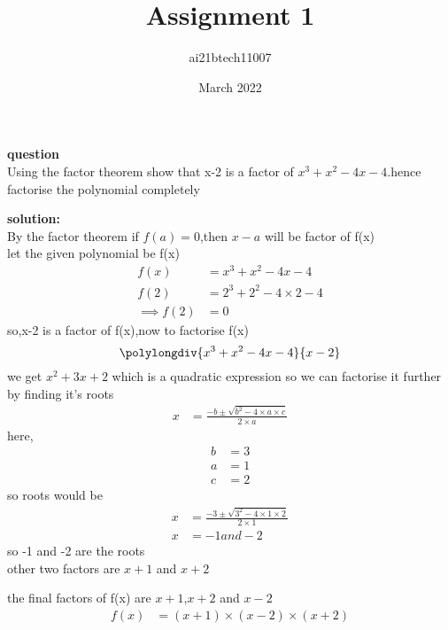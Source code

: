 \documentclass[12pt,two column]{article}
\title{Assignment 1}
\author{ai21btech11007 }
\date{March 2022}
\begin{document}
\maketitle

\textbf{question}\\
Using the factor theorem show that x-2 is a factor of $x^3+x^2-4x-4$.hence factorise the polynomial completely

\textbf{solution: }\\
By the factor theorem if $f(a)=0$,then $x-a$ will be factor of f(x)
\\let the given polynomial be f(x)
\begin{align}
  f(x) &= x^3+x^2-4x-4\\  
  f(2) &= 2^3+2^2-4\times2-4\\
\implies
f(2) &= 0
\end{align}
   so,x-2 is a factor of f(x),now to factorise f(x) 
\[
 \polylongdiv{x^3+x^2-4x-4}{x-2}
 \]
  we get $x^2+3x+2$
  which is a quadratic expression so we can factorise it further by finding it's roots
 \begin{align}
     x &= \frac{-b \pm \sqrt{b^2-4\times a\times c}}{2\times a}
 \end{align}
 here,
 \begin{align}
  b &=3\\
  a &=1\\
  c &=2
 \end{align}
 so roots would be
 \begin{align}
   x &= \frac{-3 \pm \sqrt{3^2-4\times 1\times 2}}{2\times 1} \\
   x &= -1 and -2
 \end{align}
 so -1 and -2 are the roots\\
other two factors are $x+1$ and $x+2$

the final factors of f(x) are $x+1$,$x+2$ and $x-2$
\begin{align}
f(x)&=( x+1)\times( x-2)\times( x+2)
\end{align}
\end{document}
